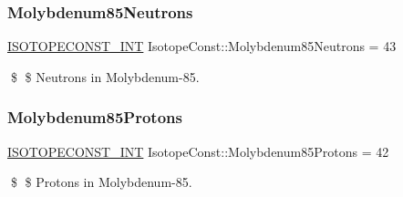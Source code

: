 \subsubsection{\texorpdfstring{Molybdenum85\+Neutrons}{Molybdenum85Neutrons}}
{\footnotesize\ttfamily \mbox{\hyperlink{group___isotope_const-_macros_ga5f18360b3e99483a35c32d789e62621c}{I\+S\+O\+T\+O\+P\+E\+C\+O\+N\+S\+T\+\_\+\+I\+NT}} Isotope\+Const\+::\+Molybdenum85\+Neutrons = 43}

\$ \$ Neutrons in Molybdenum-\/85. \mbox{\label{group___isotope_const-_molybdenum-_mo85_ga99ebaedfc45de54de861f08b9d0d892f}} 
\subsubsection{\texorpdfstring{Molybdenum85\+Protons}{Molybdenum85Protons}}
{\footnotesize\ttfamily \mbox{\hyperlink{group___isotope_const-_macros_ga5f18360b3e99483a35c32d789e62621c}{I\+S\+O\+T\+O\+P\+E\+C\+O\+N\+S\+T\+\_\+\+I\+NT}} Isotope\+Const\+::\+Molybdenum85\+Protons = 42}

\$ \$ Protons in Molybdenum-\/85. 